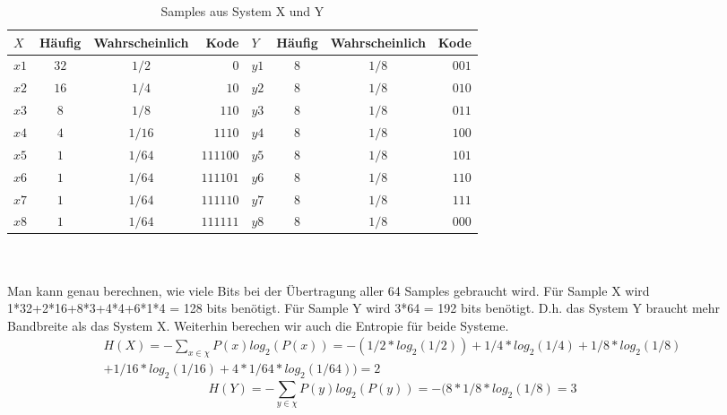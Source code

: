 \begin{table}[h]
  \begin{center}
    \begin{tabular}{lccrlccr}
      \toprule
      \bf $X$ & \bf H\"aufig & \bf Wahrscheinlich & \bf Kode 
   	& \bf $Y$ & \bf H\"aufig & \bf Wahrscheinlich & \bf Kode\\    
      \midrule     
      $x1$ 		&  $32$ 		 	& $1/2$  							& $0$	
    & $y1$		&  $8$ 		 		& $1/8$  							& $001$	\\
      $x2$ 		&  $16$ 			& $1/4$  							& $10$
    & $y2$		&  $8$ 		 		& $1/8$  							& $010$	\\
     	$x3$ 		&  $8$ 		 		& $1/8$  							& $110$	
    & $y3$		&  $8$ 		 		& $1/8$  							& $011$	\\
      $x4$ 		&  $4$ 				& $1/16$  						& $1110$
    & $y4$		&  $8$ 		 		& $1/8$  							& $100$	\\
     	$x5$ 		&  $1$ 		 		& $1/64$   						& $111100$	
    & $y5$		&  $8$ 		 		& $1/8$  							& $101$	\\
      $x6$ 		&  $1$ 				& $1/64$  						& $111101$
   	& $y6$		&  $8$ 		 		& $1/8$  							& $110$	\\
     	$x7$ 		&  $1$ 		 		& $1/64$  						& $111110$	
    & $y7$		&  $8$ 		 		& $1/8$  							& $111$	\\
      $x8$ 		&  $1$ 				& $1/64$  						& $111111$
    & $y8$		&  $8$ 		 		& $1/8$  							& $000$	\\     
      \bottomrule
    \end{tabular}
  \end{center}
\caption{Samples aus System X und Y}
\label{tab:table_2}
\end{table}
\\
\\
Man kann genau berechnen, wie viele Bits bei der \"Ubertragung aller 64 Samples gebraucht wird. F\"ur Sample X wird 1*32+2*16+8*3+4*4+6*1*4 = 128 bits ben\"otigt. F\"ur Sample Y wird 3*64 = 192 bits ben\"otigt. D.h. das System Y braucht mehr Bandbreite als das System X. Weiterhin berechen wir auch die Entropie f\"ur beide Systeme.
\begin{multline}
H(X)=-\sum_{x\in\chi}P(x)log_{2}(P(x))=-(1/2*log_{2}(1/2))+1/4*log_{2}(1/4)+1/8*log_{2}(1/8)\\
+1/16*log_{2}(1/16)+4*1/64*log_{2}(1/64))=2
\end{multline}
\begin{equation}
H(Y)=-\sum_{y\in\chi}P(y)log_{2}(P(y))=-(8*1/8*log_{2}(1/8)=3
\end{equation}
